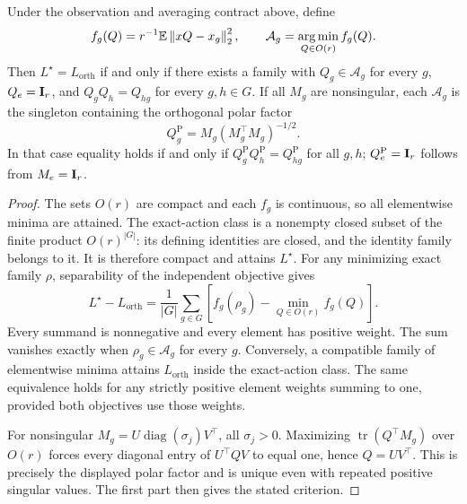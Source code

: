 \begin{proposition}
\label{sp:orthogonal-compatibility}
Under the observation and averaging contract above, define
\[
 f_g(Q)=r^{-1}\mathbb E\left\lVert xQ-x_g\right\rVert_2^2,
 \qquad \mathcal A_g=\operatorname*{arg\,min}_{Q\in O(r)}f_g(Q).
\]
Then $L^\star=L_{\mathrm{orth}}$ if and only if there exists a family with
$Q_g\in\mathcal A_g$ for every $g$, $Q_e=\mathbf{I}_r$, and
$Q_gQ_h=Q_{hg}$ for every $g,h\in G$.
If all $M_g$ are nonsingular, each $\mathcal A_g$ is the singleton containing the orthogonal polar factor
\[
 Q_g^{\mathrm P}=M_g(M_g^\top M_g)^{-1/2}.
\]
In that case equality holds if and only if
$Q_g^{\mathrm P}Q_h^{\mathrm P}=Q_{hg}^{\mathrm P}$ for all $g,h$;
$Q_e^{\mathrm P}=\mathbf{I}_r$ follows from $M_e=\mathbf{I}_r$.
\end{proposition}

\begin{proof}
The sets $O(r)$ are compact and each $f_g$ is continuous, so all elementwise minima are attained. The exact-action class is a nonempty closed subset of the finite product $O(r)^{|G|}$: its defining identities are closed, and the identity family belongs to it. It is therefore compact and attains $L^\star$. For any minimizing exact family $\rho$, separability of the independent objective gives
\[
 L^\star-L_{\mathrm{orth}}
 =\frac1{|G|}\sum_{g\in G}
 \left[f_g(\rho_g)-\min_{Q\in O(r)}f_g(Q)\right].
\]
Every summand is nonnegative and every element has positive weight. The sum vanishes exactly when $\rho_g\in\mathcal A_g$ for every $g$. Conversely, a compatible family of elementwise minima attains $L_{\mathrm{orth}}$ inside the exact-action class. The same equivalence holds for any strictly positive element weights summing to one, provided both objectives use those weights.

For nonsingular $M_g=U\operatorname{diag}(\sigma_j)V^\top$, all $\sigma_j>0$. Maximizing $\operatorname{tr}(Q^\top M_g)$ over $O(r)$ forces every diagonal entry of $U^\top QV$ to equal one, hence $Q=UV^\top$. This is precisely the displayed polar factor and is unique even with repeated positive singular values. The first part then gives the stated criterion.
\end{proof}

